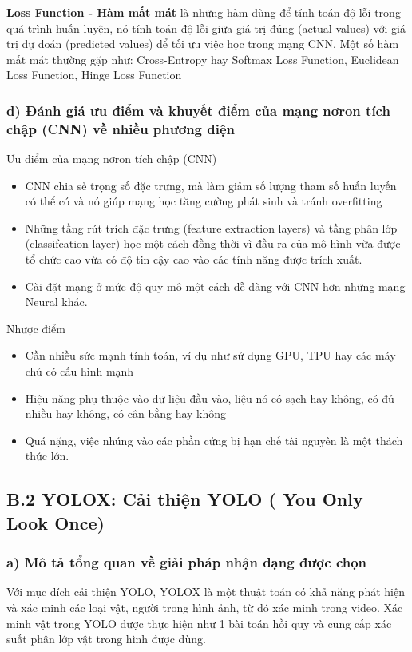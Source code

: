 \documentclass{article}
\begin{document}
	\textbf{Loss Function - Hàm mất mát} là những hàm dùng để tính toán độ lỗi trong quá trình huấn luyện, nó tính toán độ lỗi giữa giá trị đúng (actual values) với giá trị dự đoán (predicted values) để tối ưu việc học trong mạng CNN. Một số hàm mất mát thường gặp như: Cross-Entropy hay Softmax Loss Function, Euclidean Loss Function, Hinge Loss Function
	
	\subsubsection{d) Đánh giá ưu điểm và khuyết điểm của mạng nơron tích chập (CNN) về nhiều phương diện}
	Ưu điểm của mạng nơron tích chập (CNN)
	\begin{itemize}
		\item CNN chia sẻ trọng số đặc trưng, mà làm giảm số lượng tham số huấn luyến có thể có và nó giúp mạng học tăng cường phát sinh và tránh overfitting
		\item Những tầng rút trích đặc trưng (feature extraction layers) và tầng phân lớp (classifcation layer) học một cách đồng thời vì đầu ra của mô hình vừa được tổ chức cao vừa có độ tin cậy cao vào các tính năng được trích xuất.
		\item Cài đặt mạng ở mức độ quy mô một cách dễ dàng với CNN hơn những mạng Neural khác.
	\end{itemize}
	Nhược điểm
	\begin{itemize}
		\item Cần nhiều sức mạnh tính toán, ví dụ như sử dụng GPU, TPU hay các máy chủ có cấu hình mạnh
		\item Hiệu năng phụ thuộc vào dữ liệu đầu vào, liệu nó có sạch hay không, có đủ nhiều hay không, có cân bằng hay không
		\item Quá nặng, việc nhúng vào các phần cứng bị hạn chế tài nguyên là một thách thức lớn.
	\end{itemize}
	
	\subsection{B.2 YOLOX: Cải thiện YOLO ( You Only Look Once)}
	
	\subsubsection{a) Mô tả tổng quan về giải pháp nhận dạng được chọn}

	\qquad Với mục đích cải thiện YOLO, YOLOX là một thuật toán có khả năng phát hiện và xác minh các loại vật, người trong hình ảnh, từ đó xác minh trong video. Xác minh vật trong YOLO được thực hiện như 1 bài toán hồi quy và cung cấp xác suất phân lớp vật trong hình được dùng.
	
\end{document}
